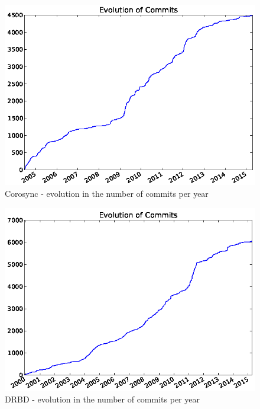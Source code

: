 \documentclass[a4paper, 12pt]{book}
\begin{document}
    \begin{figure}[H]
      \centering
      \includegraphics[scale=0.50]{fig8-4.png}
      \caption[Evolution in the number of commits for Corosync]{Corosync - evolution in the number of commits per year}
      \label{fig:fig8-4}
    \end{figure}
	  
    \begin{figure}[H]
      \centering
      \includegraphics[scale=0.50]{fig8-5.png}
      \caption[Evolution in the number of commits for DRBD]{DRBD - evolution in the number of commits per year}
      \label{fig:fig8-5}
    \end{figure}
    
\end{document}
